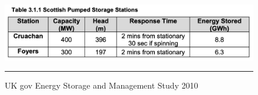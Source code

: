 \begin{figure}[htbp]
	\centering
	\includegraphics[width=.7\textwidth]{figures/Cruachan_Foyers_characteristics.png}
	\rule{\textwidth}{0.5pt} %
	\caption{UK gov Energy Storage and Management Study 2010}
	\label{fig:existing}
\end{figure}